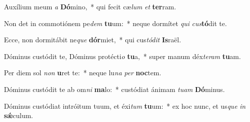 \item Auxílium meum \textit{a} \textbf{Dó}mino,~* qui fecit cæ\textit{lum} \textit{et} \textbf{ter}ram.
\item Non det in commotiónem pe\textit{dem} \textbf{tu}um:~* neque dormítet \textit{qui} \textit{cus}\textbf{tó}dit te.
\item Ecce, non dormitábit ne\textit{que} \textbf{dór}miet,~* qui cus\textit{tó}\textit{dit} \textbf{Is}raël.
\item Dóminus custódit te, Dóminus protécti\textit{o} \textbf{tu}a,~* super manum déx\textit{te}\textit{ram} \textbf{tu}am.
\item Per diem sol \textit{non} \textbf{u}ret te:~* neque lu\textit{na} \textit{per} \textbf{noc}tem.
\item Dóminus custódit te ab om\textit{ni} \textbf{ma}lo:~* custódiat ánimam \textit{tu}\textit{am} \textbf{Dó}minus.
\item Dóminus custódiat intróitum tuum, et éxi\textit{tum} \textbf{tu}um:~* ex hoc nunc, et us\textit{que} \textit{in} \textbf{sǽ}culum.
